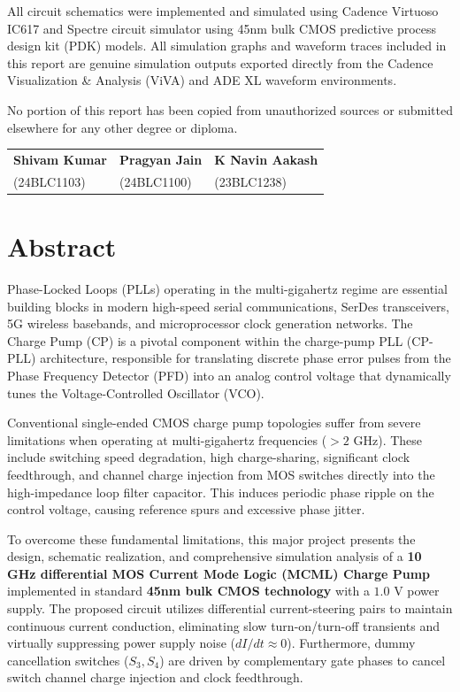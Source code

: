 \documentclass[11pt,a4paper]{report}
\begin{document}
All circuit schematics were implemented and simulated using Cadence Virtuoso IC617 and Spectre circuit simulator using 45nm bulk CMOS predictive process design kit (PDK) models. All simulation graphs and waveform traces included in this report are genuine simulation outputs exported directly from the Cadence Visualization \& Analysis (ViVA) and ADE XL waveform environments. 

No portion of this report has been copied from unauthorized sources or submitted elsewhere for any other degree or diploma.

\vspace{2.5cm}
\noindent
\begin{tabularx}{\textwidth}{XXX}
\textbf{Shivam Kumar} & \textbf{Pragyan Jain} & \textbf{K Navin Aakash} \\
(24BLC1103) & (24BLC1100) & (23BLC1238)
\end{tabularx}

\newpage

\chapter*{Abstract}

Phase-Locked Loops (PLLs) operating in the multi-gigahertz regime are essential building blocks in modern high-speed serial communications, SerDes transceivers, 5G wireless basebands, and microprocessor clock generation networks. The Charge Pump (CP) is a pivotal component within the charge-pump PLL (CP-PLL) architecture, responsible for translating discrete phase error pulses from the Phase Frequency Detector (PFD) into an analog control voltage that dynamically tunes the Voltage-Controlled Oscillator (VCO).

Conventional single-ended CMOS charge pump topologies suffer from severe limitations when operating at multi-gigahertz frequencies ($>2\text{ GHz}$). These include switching speed degradation, high charge-sharing, significant clock feedthrough, and channel charge injection from MOS switches directly into the high-impedance loop filter capacitor. This induces periodic phase ripple on the control voltage, causing reference spurs and excessive phase jitter.

To overcome these fundamental limitations, this major project presents the design, schematic realization, and comprehensive simulation analysis of a \textbf{10 GHz differential MOS Current Mode Logic (MCML) Charge Pump} implemented in standard \textbf{45nm bulk CMOS technology} with a $1.0\text{ V}$ power supply. The proposed circuit utilizes differential current-steering pairs to maintain continuous current conduction, eliminating slow turn-on/turn-off transients and virtually suppressing power supply noise ($dI/dt \approx 0$). Furthermore, dummy cancellation switches ($S_3, S_4$) are driven by complementary gate phases to cancel switch channel charge injection and clock feedthrough.
\end{document}
